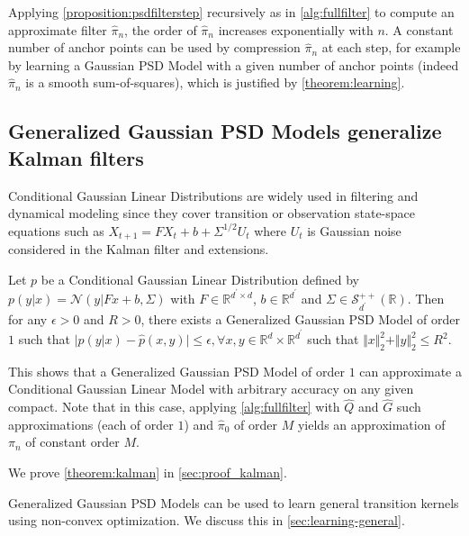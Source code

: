 Applying \cref{proposition:psdfilterstep} recursively as in \cref{alg:fullfilter} to compute an approximate filter $\hat \pi_n$, the order of $\hat\pi_n$ increases exponentially with $n$. A constant number of anchor points can be used by compression $\hat\pi_n$ at each step, for example by learning a Gaussian PSD Model with a given number of anchor points (indeed $\hat\pi_n$ is a smooth sum-of-squares), which is justified by \cref{theorem:learning}.



\subsection{Generalized Gaussian PSD Models generalize Kalman filters}

Conditional Gaussian Linear Distributions are widely used in filtering and dynamical modeling since they cover transition or observation state-space equations such as $X_{t+1} = FX_t + b + \Sigma^{1/2} U_t$ where $U_t$ is Gaussian noise considered in the Kalman filter and extensions.

\begin{theorem}\label{theorem:kalman}
Let $p$ be a Conditional Gaussian Linear Distribution defined by $p(y | x) = \mathcal N(y | Fx + b, \Sigma)$ with $F\in\mathbb R^{d ^\prime\times d}$, $b\in\mathbb R^{d^\prime}$ and $\Sigma\in\mathcal S^{++}_{d^\prime}(\mathbb R)$. Then for any $\epsilon>0$ and $R>0$, there exists a Generalized Gaussian PSD Model of order $1$ such that $\vert p(y | x) - \hat p(x, y) \vert \leq \epsilon, $$\forall x, y \in \mathbb R^d \times \mathbb R^{d^\prime}$ such that $\Vert x\Vert_2^2 + \Vert y \Vert_2^2 \leq R^2$.
\end{theorem}

This shows that a Generalized Gaussian PSD Model of order $1$ can approximate a Conditional Gaussian Linear Model with arbitrary accuracy on any given compact. Note that in this case, applying \cref{alg:fullfilter} with $\hat Q$ and $\hat G$ such approximations (each of order $1$) and $\hat\pi_0$ of order $M$ yields an approximation of $\pi_n$ of constant order $M$.

We prove \cref{theorem:kalman} in \cref{sec:proof_kalman}.

Generalized Gaussian PSD Models can be used to learn general transition kernels using non-convex optimization. We discuss this in \cref{sec:learning-general}.
